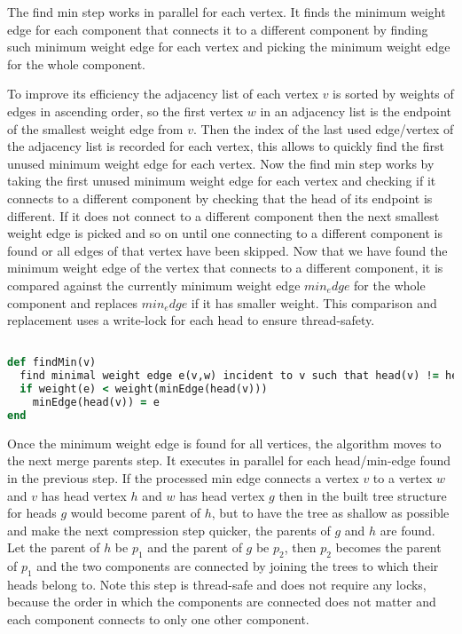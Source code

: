 \documentclass{report}
\theoremstyle{plain}
\theoremstyle{definition}
\theoremstyle{remark}
\begin{document}
The find min step works in parallel for each vertex. It finds the minimum weight edge for each component that connects it to a different component by finding such minimum weight edge for each vertex and picking the minimum weight edge for the whole component.

To improve its efficiency the adjacency list of each vertex $v$ is sorted by weights of edges in ascending order, so the first vertex $w$ in an adjacency list is the endpoint of the smallest weight edge from $v$. Then the index of the last used edge/vertex of the adjacency list is recorded for each vertex, this allows to quickly find the first unused minimum weight edge for each vertex. Now the find min step works by taking the first unused minimum weight edge for each vertex and checking if it connects to a different component by checking that the head of its endpoint is different. If it does not connect to a different component then the next smallest weight edge is picked and so on until one connecting to a different component is found or all edges of that vertex have been skipped. Now that we have found the minimum weight edge of the vertex that connects to a different component, it is compared against the currently minimum weight edge $min_edge$ for the whole component and replaces $min_edge$ if it has smaller weight. This comparison and replacement uses a write-lock for each head to ensure thread-safety. 

\begin{lstlisting}[language=Ruby]

def findMin(v)
  find minimal weight edge e(v,w) incident to v such that head(v) != head(w)
  if weight(e) < weight(minEdge(head(v)))
    minEdge(head(v)) = e
end
\end{lstlisting}

Once the minimum weight edge is found for all vertices, the algorithm moves to the next merge parents step. It executes in parallel for each head/min-edge found in the previous step. If the processed min edge connects a vertex $v$ to a vertex $w$ and $v$ has head vertex $h$ and $w$ has head vertex $g$ then in the built tree structure for heads $g$ would become parent of $h$, but to have the tree as shallow as possible and make the next compression step quicker, the parents of $g$ and $h$ are found. Let the parent of $h$ be $p_1$ and the parent of $g$ be $p_2$, then $p_2$ becomes the parent of $p_1$ and the two components are connected by joining the trees to which their heads belong to. Note this step is thread-safe and does not require any locks, because the order in which the components are connected does not matter and each component connects to only one other component.
\end{document}
